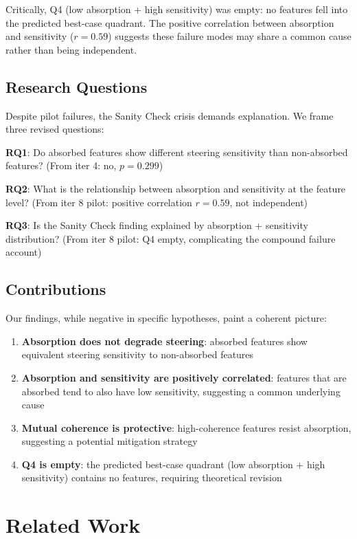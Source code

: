 \documentclass{article}
\begin{document}
Critically, Q4 (low absorption + high sensitivity) was empty: no features fell into the predicted best-case quadrant. The positive correlation between absorption and sensitivity ($r = 0.59$) suggests these failure modes may share a common cause rather than being independent.

\subsection{Research Questions}

Despite pilot failures, the Sanity Check crisis demands explanation. We frame three revised questions:

\textbf{RQ1}: Do absorbed features show different steering sensitivity than non-absorbed features? (From iter 4: no, $p = 0.299$)

\textbf{RQ2}: What is the relationship between absorption and sensitivity at the feature level? (From iter 8 pilot: positive correlation $r = 0.59$, not independent)

\textbf{RQ3}: Is the Sanity Check finding explained by absorption + sensitivity distribution? (From iter 8 pilot: Q4 empty, complicating the compound failure account)

\subsection{Contributions}

Our findings, while negative in specific hypotheses, paint a coherent picture:

\begin{enumerate}
  \item \textbf{Absorption does not degrade steering}: absorbed features show equivalent steering sensitivity to non-absorbed features
  \item \textbf{Absorption and sensitivity are positively correlated}: features that are absorbed tend to also have low sensitivity, suggesting a common underlying cause
  \item \textbf{Mutual coherence is protective}: high-coherence features resist absorption, suggesting a potential mitigation strategy
  \item \textbf{Q4 is empty}: the predicted best-case quadrant (low absorption + high sensitivity) contains no features, requiring theoretical revision
\end{enumerate}

\section{Related Work}
\end{document}
